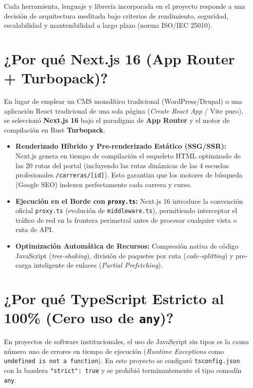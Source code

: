 \documentclass[12pt,a4paper,oneside]{report}
\begin{document}
Cada herramienta, lenguaje y librería incorporada en el proyecto responde a una decisión de arquitectura meditada bajo criterios de rendimiento, seguridad, escalabilidad y mantenibilidad a largo plazo (norma ISO/IEC 25010).

\section{¿Por qué Next.js 16 (App Router + Turbopack)?}
En lugar de emplear un CMS monolítico tradicional (WordPress/Drupal) o una aplicación React tradicional de una sola página (\textit{Create React App} / Vite puro), se seleccionó \textbf{Next.js 16} bajo el paradigma de \textbf{App Router} y el motor de compilación en Rust \textbf{Turbopack}.

\begin{itemize}[leftmargin=1.0cm]
  \item \textbf{Renderizado Híbrido y Pre-renderizado Estático (SSG/SSR):} Next.js genera en tiempo de compilación el esqueleto HTML optimizado de las 20 rutas del portal (incluyendo las rutas dinámicas de las 4 escuelas profesionales \texttt{/carreras/[id]}). Esto garantiza que los motores de búsqueda (Google SEO) indexen perfectamente cada carrera y curso.
  \item \textbf{Ejecución en el Borde con \texttt{proxy.ts}:} Next.js 16 introduce la convención oficial \texttt{proxy.ts} (evolución de \texttt{middleware.ts}), permitiendo interceptar el tráfico de red en la frontera perimetral antes de procesar cualquier vista o ruta de API.
  \item \textbf{Optimización Automática de Recursos:} Compresión nativa de código JavaScript (\textit{tree-shaking}), división de paquetes por ruta (\textit{code-splitting}) y pre-carga inteligente de enlaces (\textit{Partial Prefetching}).
\end{itemize}

\section{¿Por qué TypeScript Estricto al 100\% (Cero uso de \texttt{any})?}
En proyectos de software institucionales, el uso de JavaScript sin tipos es la causa número uno de errores en tiempo de ejecución (\textit{Runtime Exceptions} como \texttt{undefined is not a function}). En este proyecto se configuró \texttt{tsconfig.json} con la bandera \texttt{"strict": true} y se prohibió terminantemente el tipo comodín \texttt{any}.
\end{document}
